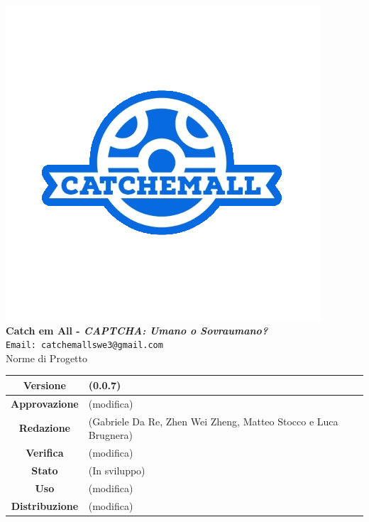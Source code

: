 \begin{titlepage}
\begin{center}
	\includegraphics[scale = 1.5]{img/logo.png}\\
	\bigskip
	\large \textbf{Catch em All - \textit{CAPTCHA: Umano o Sovraumano?}}\\
	\texttt{Email: catchemallswe3@gmail.com}\\
	\vfill
	{\fontsize{1.5cm}{0}\selectfont Norme di Progetto}\\
	\vfill
	\renewcommand\tabularxcolumn[1]{>{\Centering}m{#1}}
	\begin{tabularx}{\textwidth}{|c|X|}
		\hline
		\textbf{Versione} & (0.0.7)\\
		\hline
		\textbf{Approvazione} & (modifica)\\
		\hline
		\textbf{Redazione} & (Gabriele Da Re, Zhen Wei Zheng, Matteo Stocco e Luca Brugnera)\\
		\hline
		\textbf{Verifica} & (modifica)\\
		\hline
		\textbf{Stato} & (In sviluppo)\\
		\hline
		\textbf{Uso} & (modifica)\\
		\hline
		\textbf{Distribuzione} & (modifica)\\
		\hline
	\end{tabularx}
\end{center}
\end{titlepage}